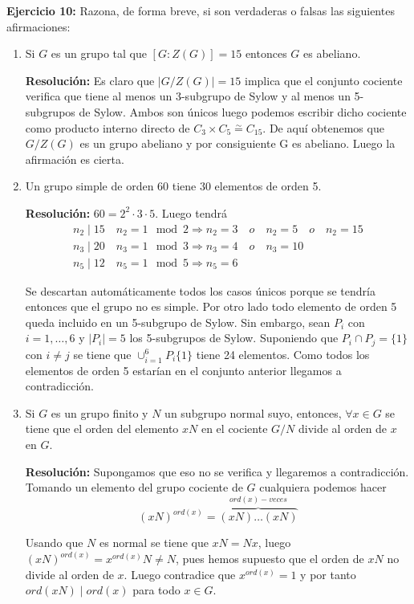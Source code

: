 \documentclass{article}
\begin{document}
\textbf{Ejercicio 10:} Razona, de forma breve, si son verdaderas o falsas las siguientes afirmaciones:
\begin{enumerate}
\item Si $G$ es un grupo tal que $\left[G:Z(G)\right]=15$ entonces $G$ es abeliano.

\textbf{Resolución:} Es claro que $|G/Z(G)|=15$ implica que el conjunto cociente verifica que tiene al menos un 3-subgrupo de Sylow y al menos un 5-subgrupos de Sylow. Ambos son únicos luego podemos escribir dicho cociente como producto interno directo de $C_3\times C_{5}\overset{\sim}{=} C_{15}$. De aquí obtenemos que $G/Z(G)$ es un grupo abeliano y por consiguiente G es abeliano. Luego la afirmación es cierta.

\item Un grupo simple de orden 60 tiene 30 elementos de orden 5.

\textbf{Resolución:} $60=2^2\cdot 3\cdot 5$. Luego tendrá 
\begin{gather*}
n_2\mid 15 \quad n_2=1\mod 2\Rightarrow n_2=3\quad o \quad n_2=5\quad o\quad n_2=15\\
n_3\mid 20 \quad n_3=1\mod 3\Rightarrow n_3=4 \quad o\quad n_3=10\\
n_5\mid 12 \quad n_5=1\mod 5\Rightarrow n_5=6
\end{gather*}

Se descartan automáticamente todos los casos únicos porque se tendría entonces que el grupo no es simple. Por otro lado todo elemento de orden 5 queda incluido en un 5-subgrupo de Sylow. Sin embargo, sean $P_i$ con $i=1,\ldots, 6$ y $|P_i|=5$ los 5-subgrupos de Sylow. Suponiendo que $P_i\cap P_j=\{1\}$ con $i\neq j$ se tiene que 
$\cup_{i=1}^6 P_i\{1\}$ tiene 24 elementos. Como todos los elementos de orden 5 estarían en el conjunto anterior llegamos a contradicción.

\item Si $G$ es un grupo finito y $N$ un subgrupo normal suyo, entonces, $\forall x\in G$ se tiene que el orden del elemento $xN$ en el cociente $G/N$ divide al orden de $x$ en $G$.

\textbf{Resolución:} Supongamos que eso no se verifica y llegaremos a contradicción. Tomando un elemento del grupo cociente de $G$ cualquiera podemos hacer
\begin{equation*}
(xN)^{ord(x)}=\overbrace{(xN)\ldots(xN)}^{ord(x)-veces}
\end{equation*}

Usando que $N$ es normal se tiene que $xN=Nx$, luego $(xN)^{ord(x)}=x^{ord(x)}N\neq N$, pues hemos supuesto que el orden de $xN$ no divide al orden de $x$. Luego contradice que $x^{ord(x)}=1$ y por tanto $ord(xN)\mid ord(x)$ para todo $x\in G$.


\end{enumerate}
\end{document}
